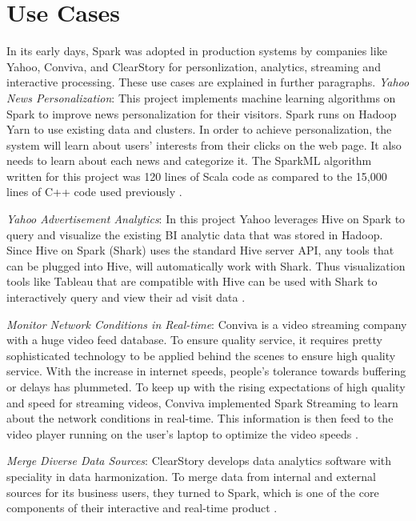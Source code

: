 \documentclass[9pt,twocolumn,twoside]{../../styles/osajnl}
\begin{document}
\section{Use Cases}

In its early days, Spark was adopted in production systems by
companies like Yahoo, Conviva, and ClearStory for personlization,
analytics, streaming and interactive processing. These use cases are
explained in further paragraphs.  \textit{Yahoo News Personalization}:
This project implements machine learning algorithms on Spark to
improve news personalization for their visitors. Spark runs on Hadoop
Yarn to use existing data and clusters. In order to achieve
personalization, the system will learn about users’ interests from
their clicks on the web page. It also needs to learn about each news
and categorize it. The SparkML algorithm written for this project was
120 lines of Scala code as compared to the 15,000 lines of C++ code
used previously \cite{www-spark-datanami}.

\textit{Yahoo Advertisement Analytics}: In this project Yahoo
leverages Hive on Spark to query and visualize the existing BI
analytic data that was stored in Hadoop. Since Hive on Spark (Shark)
uses the standard Hive server API, any tools that can be plugged into
Hive, will automatically work with Shark. Thus visualization tools
like Tableau that are compatible with Hive can be used with Shark to
interactively query and view their ad visit data
\cite{www-spark-datanami}.

\textit{Monitor Network Conditions in Real-time}: Conviva is a video
streaming company with a huge video feed database. To ensure quality
service, it requires pretty sophisticated technology to be applied
behind the scenes to ensure high quality service. With the increase in
internet speeds, people's tolerance towards buffering or delays has
plummeted. To keep up with the rising expectations of high quality and
speed for streaming videos, Conviva implemented Spark Streaming to
learn about the network conditions in real-time. This information is
then feed to the video player running on the user's laptop to optimize
the video speeds \cite{www-spark-datanami}.

\textit{Merge Diverse Data Sources}: ClearStory develops data
analytics software with speciality in data harmonization. To merge
data from internal and external sources for its business users, they
turned to Spark, which is one of the core components of their
interactive and real-time product \cite{www-spark-datanami}.
\end{document}

